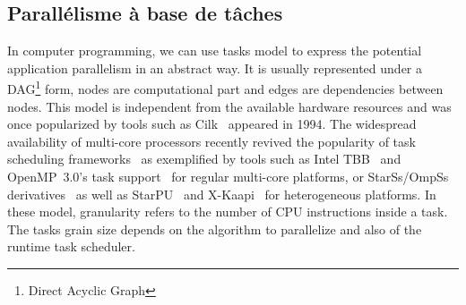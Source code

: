 \subsection{Parallélisme à base de tâches}




In computer programming, we can use tasks model to express the potential application parallelism in an abstract way.
%
It is usually represented under a DAG\footnote{Direct Acyclic Graph} form, nodes are computational part and edges are dependencies between nodes.
%
This model is independent from the available hardware resources and was once popularized by tools such as Cilk~\cite{Cilk} appeared in 1994.
%
The widespread availability of multi-core processors recently revived the popularity of task scheduling frameworks~\cite{taskscomparison} as exemplified by tools such as Intel TBB~\cite{Intel::TBB} and OpenMP~3.0's task support~\cite{openmptasks} for regular multi-core platforms, or StarSs/OmpSs derivatives~\cite{OMPSs} as well as StarPU~\cite{starpu} and X-Kaapi~\cite{xkaapi} for heterogeneous platforms.
%
In these model, granularity refers to the number of CPU instructions inside a task.
%
The tasks grain size depends on the algorithm to parallelize and also of the runtime task scheduler.
